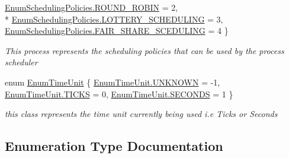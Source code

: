 \begin{DoxyCompactItemize}
\hyperlink{namespace_c_p_u___o_s___simulator_1_1_operating___system_ad0cdaacf9652394d23fa29109640fe08a1ebd8dbf8c34e255f5cbf28f35860b71}{Enum\+Scheduling\+Policies.\+R\+O\+U\+N\+D\+\_\+\+R\+O\+B\+I\+N} = 2, 
\\*
\hyperlink{namespace_c_p_u___o_s___simulator_1_1_operating___system_ad0cdaacf9652394d23fa29109640fe08aa4d25b80a5834b7f9ff2a2153f3b5985}{Enum\+Scheduling\+Policies.\+L\+O\+T\+T\+E\+R\+Y\+\_\+\+S\+C\+H\+E\+D\+U\+L\+I\+N\+G} = 3, 
\hyperlink{namespace_c_p_u___o_s___simulator_1_1_operating___system_ad0cdaacf9652394d23fa29109640fe08abce82cf69e3b635b2e6aaacec9cb17dd}{Enum\+Scheduling\+Policies.\+F\+A\+I\+R\+\_\+\+S\+H\+A\+R\+E\+\_\+\+S\+C\+E\+D\+U\+L\+I\+N\+G} = 4
 \}\begin{DoxyCompactList}\small\item\em This process represents the scheduling policies that can be used by the process scheduler \end{DoxyCompactList}
\item 
enum \hyperlink{namespace_c_p_u___o_s___simulator_1_1_operating___system_a0553d0bc2513aec52caa769acf994d5c}{Enum\+Time\+Unit} \{ \hyperlink{namespace_c_p_u___o_s___simulator_1_1_operating___system_a0553d0bc2513aec52caa769acf994d5ca696b031073e74bf2cb98e5ef201d4aa3}{Enum\+Time\+Unit.\+U\+N\+K\+N\+O\+W\+N} = -\/1, 
\hyperlink{namespace_c_p_u___o_s___simulator_1_1_operating___system_a0553d0bc2513aec52caa769acf994d5caecf45696420c3fbb68822dafc3378261}{Enum\+Time\+Unit.\+T\+I\+C\+K\+S} = 0, 
\hyperlink{namespace_c_p_u___o_s___simulator_1_1_operating___system_a0553d0bc2513aec52caa769acf994d5caa9126caa6ef3db9cf3c35ac627ad22b5}{Enum\+Time\+Unit.\+S\+E\+C\+O\+N\+D\+S} = 1
 \}\begin{DoxyCompactList}\small\item\em this class represents the time unit currently being used i.\+e Ticks or Seconds \end{DoxyCompactList}
\end{DoxyCompactItemize}


\subsection{Enumeration Type Documentation}
\hypertarget{namespace_c_p_u___o_s___simulator_1_1_operating___system_aea0b669d1bbf5690ae34ac2f8bef9470}{}
